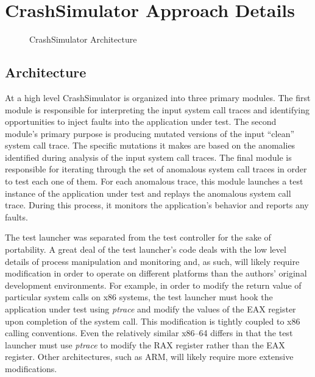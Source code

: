 \section{CrashSimulator Approach Details}

    \begin{figure}[t]
        \center{}
        \caption{CrashSimulator Architecture}
    \end{figure}

    \subsection{Architecture}

        At a high level CrashSimulator is organized into three primary modules. The first module is responsible for
        interpreting the input system call traces and identifying opportunities to inject faults into the application
        under test. The second module's primary purpose is producing mutated versions of the input ``clean'' system call
        trace. The specific mutations it makes are based on the anomalies identified during analysis of the input system
        call traces. The final module is responsible for iterating through the set of anomalous system call traces in
        order to test each one of them. For each anomalous trace, this module launches a test instance of the
        application under test and replays the anomalous system call trace. During this process, it monitors the
        application's behavior and reports any faults.

        The test launcher was separated from the test controller for the sake of portability. A great deal of the test
        launcher's code deals with the low level details of process manipulation and monitoring and, as such, will
        likely require modification in order to operate on different platforms than the authors' original development
        environments. For example, in order to modify the return value of particular system calls on x86 systems, the
        test launcher must hook the application under test using \emph{ptrace} and modify the values of the EAX register
        upon completion of the system call. This modification is tightly coupled to x86 calling conventions. Even the
        relatively similar x86--64 differs in that the test launcher must use \emph{ptrace} to modify the RAX register
        rather than the EAX register. Other architectures, such as ARM, will likely require more extensive
        modifications.

